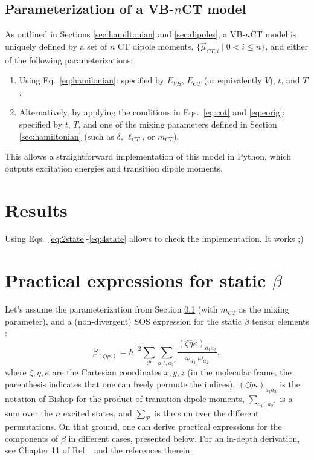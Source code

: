 \documentclass[12pt,a4paper]{article}
\begin{document}
\subsection{Parameterization of a VB-$n$CT model} \label{sec:param}

As outlined in Sections \ref{sec:hamiltonian} and \ref{sec:dipoles}, a VB-$n$CT model is uniquely defined by a set of $n$ CT dipole moments, $\{\vec{\mu}_{CT,i} \mid 0 < i \leq n\}$, and either of the following parameterizations:
\begin{enumerate}
	\item Using Eq.~\eqref{eq:hamilonian}: specified by $E_{VB}$, $E_{CT}$ (or equivalently $V$), $t$, and $T$;
	\item Alternatively, by applying the conditions in Eqs.~\eqref{eq:cot} and \eqref{eq:eorig}: specified by $t$, $T$, and one of the mixing parameters defined in Section \ref{sec:hamiltonian} (such as $\delta$, $\ell_{CT}$, or $m_{CT}$).
\end{enumerate}
This allows a straightforward implementation of this model in Python, which outputs excitation energies and transition dipole moments.

\section{Results}

Using Eqs.~\ref{eq:2state}-\ref{eq:4state} allows to check  the implementation. It works ;)


\clearpage
\appendix
\setcounter{equation}{0} 
\renewcommand{\theequation}{A\arabic{equation}}

\section{Practical expressions for static $\beta$}

Let's assume the parameterization from Section \ref{sec:param} (with $m_{CT}$ as the mixing parameter), and a (non-divergent) SOS expression  for the static $\beta$ tensor elements \cite{bishopExplicitNondivergentFormulas1994}:\begin{equation}
	\beta_{(\zeta\eta\kappa)} = \hbar^{-2} \sum_\mathcal{P} \sum_{a_1', a_2'} \frac{(\zeta\bar{\eta}\kappa)_{a_1 a_2}}{\omega_{a_1}\,\omega_{a_2}},\label{eq:sos}
\end{equation}
where $\zeta, \eta, \kappa$ are the Cartesian coordinates $x, y, z$ (in the molecular frame, the parenthesis indicates that one can freely permute the indices), $(\zeta\bar{\eta}\kappa)_{a_1 a_2}$ is the notation of Bishop for the product of transition dipole moments, $\sum_{a_1', a_2'}$ is a sum over the $n$ excited states, and $\sum_{\mathcal{P}}$ is the sum over the different permutations. On that ground, one  can derive practical expressions for the components of $\beta$ in different cases, presented below. For an in-depth derivation, see Chapter 11 of Ref.~\cite{mythesis} and the references therein.
\end{document}
